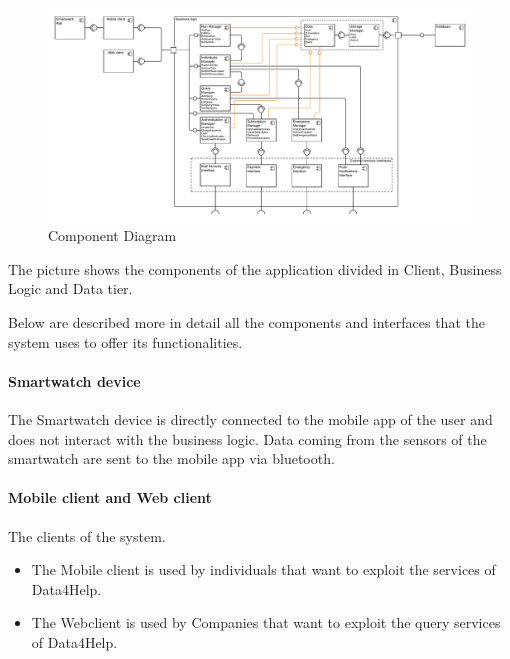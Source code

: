 \begin{figure}[H]
	\includegraphics[width=\textwidth,height=\textheight,keepaspectratio]{assets/ComponentDiagram.pdf}
	\caption{Component Diagram}
	\label{fig:CD}
\end{figure}


\noindent The picture shows the components of the application divided in Client, Business Logic and Data tier.

\noindent Below are described more in detail all the components and interfaces that the system uses to offer its functionalities.

\paragraph{Smartwatch device} \mbox{} \newline
The Smartwatch device is directly connected to the mobile app of the user and does not interact with the business logic.
Data coming from the sensors of the smartwatch are sent to the mobile app via bluetooth.

\paragraph{Mobile client and Web client} \mbox{} \newline
The clients of the system.
\begin{itemize}
    \item The Mobile client is used by individuals that want to exploit the services of Data4Help.
    \item The Webclient is used by Companies that want to exploit the query services of Data4Help.
\end{itemize}


